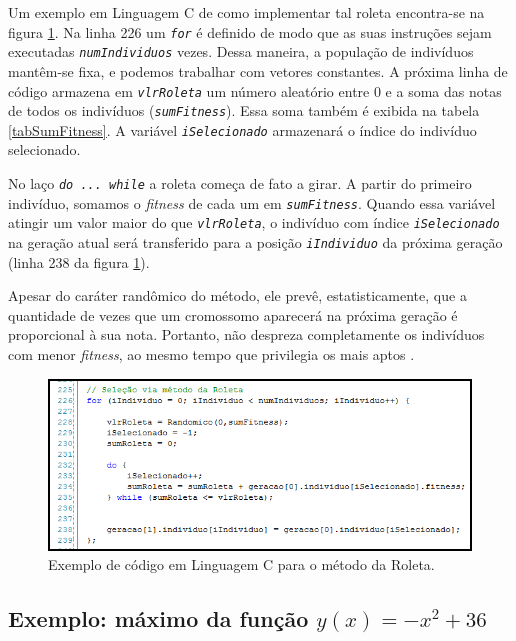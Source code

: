 	Um exemplo em Linguagem C de como implementar tal roleta encontra-se na figura \ref{figCodRoleta}. Na linha 226 um \textit{\texttt{for}} é definido de modo que as suas instruções sejam executadas \textit{\texttt{numIndividuos}} vezes. Dessa maneira, a população de indivíduos mantêm-se fixa, e podemos trabalhar com vetores constantes. A próxima linha de código armazena em \textit{\texttt{vlrRoleta}} um número aleatório entre 0 e a soma das notas de todos os indivíduos (\textit{\texttt{sumFitness}}). Essa soma também é exibida na tabela \ref{tabSumFitness}. A variável \textit{\texttt{iSelecionado}} armazenará o índice do indivíduo selecionado.
	
	No laço \textit{\texttt{do ... while}} a roleta começa de fato a girar. A partir do primeiro indivíduo, somamos o \textit{fitness} de cada um em \textit{\texttt{sumFitness}}. Quando essa variável atingir um valor maior do que \textit{\texttt{vlrRoleta}}, o indivíduo com índice \textit{\texttt{iSelecionado}} na geração atual será transferido para a posição \textit{\texttt{iIndividuo}} da próxima geração (linha 238 da figura \ref{figCodRoleta}). 
	
	Apesar do caráter randômico do método, ele prevê, estatisticamente, que a quantidade de vezes que um cromossomo aparecerá na próxima geração é proporcional à sua nota. Portanto, não despreza completamente os indivíduos com menor \textit{fitness}, ao mesmo tempo que privilegia os mais aptos \cite{Linden2008}.

	\begin{figure}[htp]
		\begin{center}
			\includegraphics[width=13cm]{figs/ga/CodigoRoleta.png}
		\end{center}
		\caption{\label{figCodRoleta}Exemplo de código em Linguagem C para o método da Roleta.}
	\end{figure}
	
	\subsection{Exemplo: máximo da função $y(x) = -x^2 + 36$}
	
